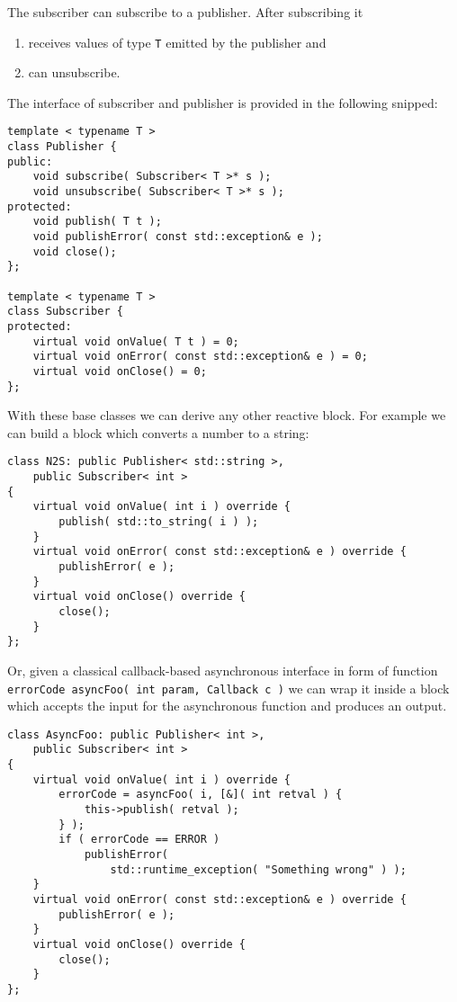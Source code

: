 \noindent The subscriber can subscribe to a publisher. After subscribing it
\begin{enumerate}
    \item receives values of type \texttt{T} emitted by the publisher and
    \item can unsubscribe.
\end{enumerate}

The interface of subscriber and publisher is provided in the
following snipped:
\begin{verbatim}
template < typename T >
class Publisher {
public:
    void subscribe( Subscriber< T >* s );
    void unsubscribe( Subscriber< T >* s );
protected:
    void publish( T t );
    void publishError( const std::exception& e );
    void close();
};

template < typename T >
class Subscriber {
protected:
    virtual void onValue( T t ) = 0;
    virtual void onError( const std::exception& e ) = 0;
    virtual void onClose() = 0;
};
\end{verbatim}

With these base classes we can derive any other reactive block. For example we
can build a block which converts a number to a string:
\begin{verbatim}
class N2S: public Publisher< std::string >,
    public Subscriber< int >
{
    virtual void onValue( int i ) override {
        publish( std::to_string( i ) );
    }
    virtual void onError( const std::exception& e ) override {
        publishError( e );
    }
    virtual void onClose() override {
        close();
    }
};
\end{verbatim}

Or, given a classical callback-based asynchronous interface in form of function
\texttt{errorCode asyncFoo( int param, Callback c )} we can
wrap it inside a block which accepts the input for the asynchronous function and
produces an output.
\begin{verbatim}
class AsyncFoo: public Publisher< int >,
    public Subscriber< int >
{
    virtual void onValue( int i ) override {
        errorCode = asyncFoo( i, [&]( int retval ) {
            this->publish( retval );
        } );
        if ( errorCode == ERROR )
            publishError(
                std::runtime_exception( "Something wrong" ) );
    }
    virtual void onError( const std::exception& e ) override {
        publishError( e );
    }
    virtual void onClose() override {
        close();
    }
};
\end{verbatim}

